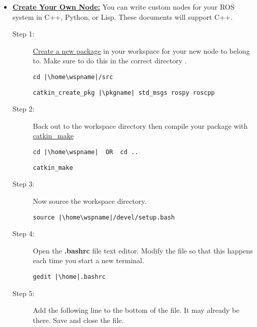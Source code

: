 \documentclass[12pt]{article}
\newcommand{\R}{\color{red}}
\newcommand{\K}{\color{black}}
\newcommand{\G}{\color{mygreen}}
\newcommand{\pkgname}{\G<package\_name>\K}
\newcommand{\wspname}{\R<workspace\_name>\K}
\newcommand{\home}{\textasciitilde/}
\begin{document}
\begin{itemize}
\begin{description}
	\end{description}

\newpage
    \item \href{http://wiki.ros.org/ROS/Tutorials/WritingPublisherSubscriber(c++)}{{\bf Create Your Own Node:}} You can write custom nodes for your ROS system in C++, Python, or Lisp. These documents will support C++.
         \begin{description}    				
          \item [Step 1:] \href{http://wiki.ros.org/ROS/Tutorials/CreatingPackage}{Create a new package} in your workspace for your new node to belong to. Make sure to do this in the correct directory .
\begin{verbatim} 
cd |\home\wspname|/src
\end{verbatim}

\begin{verbatim} 
catkin_create_pkg |\pkgname| std_msgs rospy roscpp
\end{verbatim}
            
            
            
\item [Step 2:] Back out to the workspace directory then compile your package with \href{http://wiki.ros.org/catkin/Tutorials/using_a_workspace#Building_Packages_in_a_catkin_Workspace}{catkin\_make} 

\begin{verbatim}  
cd |\home\wspname| 	OR 	cd ..
\end{verbatim}
             
\begin{verbatim}  
catkin_make
\end{verbatim}
            
 \item [Step 3:]  Now source the workspace directory.
\begin{verbatim}   
source |\home\wspname|/devel/setup.bash
\end{verbatim}

\item[Step 4:]  Open the {\bf .bashrc} file text editor. Modify the file so that this happens 
each time you start a new terminal. 
			
\begin{verbatim}  
gedit |\home|.bashrc
\end{verbatim}

\item [Step 5:] Add the following line to the bottom of the file. It may already be there. Save and close the file.		
						

\end{description}
\end{itemize}
\end{document}
